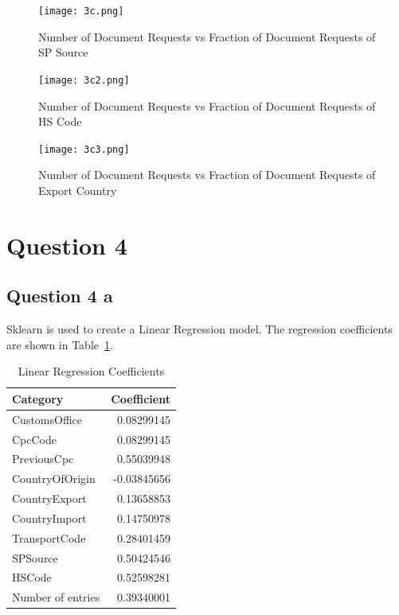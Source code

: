 \documentclass[a4paper,12pt]{article}
\numberwithin{equation}{section}
\numberwithin{figure}{section}
\numberwithin{table}{section}
\begin{document}



\begin{figure}[!htb]
    \centering
    \texttt{[image: 3c.png]}
    \caption{Number of Document Requests vs Fraction of Document Requests of SP Source}
    \label{fig:2e}
\end{figure}
\FloatBarrier

\begin{figure}[!htb]
    \centering
    \texttt{[image: 3c2.png]}
    \caption{Number of Document Requests vs Fraction of Document Requests of HS Code}
    \label{fig:2e}
\end{figure}
\FloatBarrier
\begin{figure}[!htb]
    \centering
    \texttt{[image: 3c3.png]}
    \caption{Number of Document Requests vs Fraction of Document Requests of Export Country}
    \label{fig:2e}
\end{figure}
\FloatBarrier


\section{Question 4}
\subsection{Question 4 a}
Sklearn is used to create a Linear Regression model. The regression coefficients are shown in Table~\ref{tab:reg}.



\begin{table}[!htb]
    \centering
    \caption{Linear Regression Coefficients}
    \label{tab:reg}
    \begin{tabular}{lr}
    \toprule
    Category & Coefficient \\\midrule
    CustomsOffice & 0.08299145\\
    CpcCode & 0.08299145\\
    PreviousCpc & 0.55039948\\
    CountryOfOrigin & -0.03845656\\
    CountryExport & 0.13658853\\
    CountryImport & 0.14750978\\
    TransportCode & 0.28401459\\
    SPSource & 0.50424546\\
    HSCode & 0.52598281\\
    Number of entries & 0.39340001\\\bottomrule
    \end{tabular}
\end{table}
\end{document}
